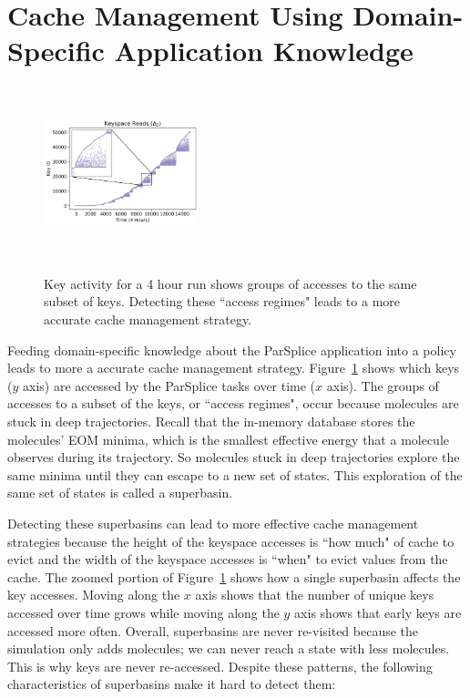 \section{Cache Management Using Domain-Specific Application Knowledge}
\label{sec:cache-management-using-domain-specific-knowledge}
\begin{figure}[t]
  \noindent\includegraphics[height=5cm,width=0.4\textwidth]{figures/keyspace-zoomed.png}\\

  \caption{Key activity for a 4 hour run shows groups of accesses to the same
  subset of keys. Detecting these ``access regimes" leads to a more accurate cache
  management strategy.\label{fig:keyspace-zoomed}}

\end{figure}

Feeding domain-specific knowledge about the ParSplice application into a policy
leads to more a accurate cache management strategy.
Figure~\ref{fig:keyspace-zoomed} shows which keys (\(y\) axis) are accessed by
the ParSplice tasks over time (\(x\) axis). The groups of accesses to a subset
of the keys, or ``access regimes", occur because molecules are stuck in deep
trajectories. Recall that the in-memory database stores the molecules' EOM
minima, which is the smallest effective energy that a molecule observes during
its trajectory. So molecules stuck in deep trajectories explore the same minima
until they can escape to a new set of states. This exploration of the same set
of states is called a superbasin. 

Detecting these superbasins can lead to more effective cache management
strategies because the height of the keyspace accesses is ``how much" of cache
to evict and the width of the keyspace accesses is ``when" to evict values from
the cache.  The zoomed portion of Figure~\ref{fig:keyspace-zoomed} shows how a
single superbasin affects the key accesses. Moving along the \(x\) axis shows
that the number of unique keys accessed over time grows while moving along the
\(y\) axis shows that early keys are accessed more often.  Overall, superbasins
are never re-visited because the simulation only adds molecules; we can never
reach a state with less molecules. This is why keys are never re-accessed.
Despite these patterns, the following characteristics of superbasins make it
hard to detect them:

